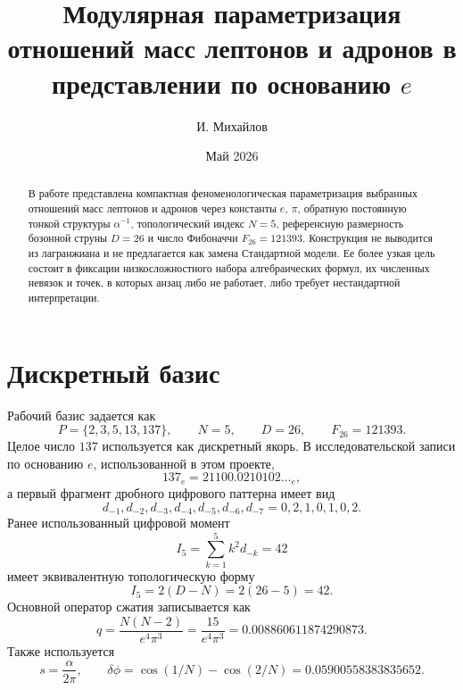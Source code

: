 \documentclass[11pt]{article}
\title{Модулярная параметризация отношений масс лептонов и адронов в представлении по основанию $e$}
\author{И. Михайлов}
\date{Май 2026}
\begin{document}
\maketitle

\begin{abstract}
В работе представлена компактная феноменологическая параметризация выбранных
отношений масс лептонов и адронов через константы $e$, $\pi$, обратную
постоянную тонкой структуры $\alpha^{-1}$, топологический индекс $N=5$,
референсную размерность бозонной струны $D=26$ и число Фибоначчи
$F_{26}=121393$. Конструкция не выводится из лагранжиана и не предлагается как
замена Стандартной модели. Ее более узкая цель состоит в фиксации
низкосложностного набора алгебраических формул, их численных невязок и точек,
в которых анзац либо не работает, либо требует нестандартной интерпретации.
\end{abstract}

\section{Дискретный базис}

Рабочий базис задается как
\begin{equation}
    P=\{2,3,5,13,137\}, \qquad N=5,\qquad D=26,\qquad F_{26}=121393.
\end{equation}
Целое число $137$ используется как дискретный якорь. В исследовательской
записи по основанию $e$, использованной в этом проекте,
\begin{equation}
    137_e = 21100.0210102\ldots_e ,
\end{equation}
а первый фрагмент дробного цифрового паттерна имеет вид
\begin{equation}
    d_{-1},d_{-2},d_{-3},d_{-4},d_{-5},d_{-6},d_{-7}
    =
    0,2,1,0,1,0,2.
\end{equation}
Ранее использованный цифровой момент
\begin{equation}
    I_5=\sum_{k=1}^{5}k^2d_{-k}=42
\end{equation}
имеет эквивалентную топологическую форму
\begin{equation}
    I_5=2(D-N)=2(26-5)=42.
\end{equation}
Основной оператор сжатия записывается как
\begin{equation}
    q = \frac{N(N-2)}{e^4\pi^3}
      = \frac{15}{e^4\pi^3}
      =0.008860611874290873.
\end{equation}
Также используется
\begin{equation}
    s=\frac{\alpha}{2\pi}, \qquad
    \delta\phi=\cos(1/N)-\cos(2/N)=0.05900558383835652.
\end{equation}
\end{document}

